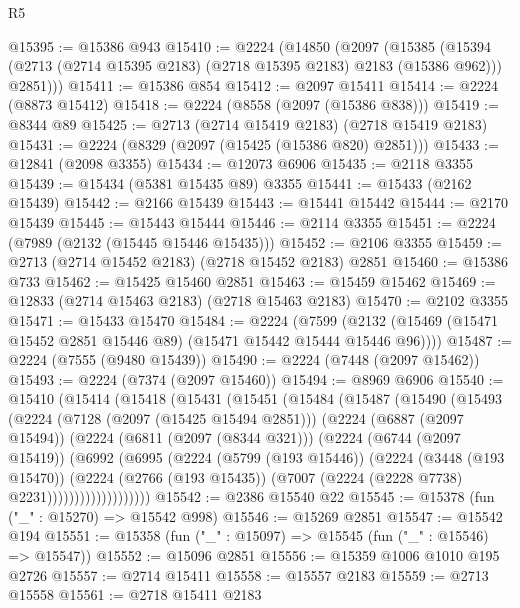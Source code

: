 \begin{lexlean}{R5}
\begin{coremodule}
@15395 := @15386 @943
@15410 := @2224
    (@14850
      (@2097
        (@15385
          (@15394 (@2713 (@2714 @15395 @2183) (@2718 @15395 @2183) @2183 (@15386 @962)))
          @2851)))
@15411 := @15386 @854
@15412 := @2097 @15411
@15414 := @2224 (@8873 @15412)
@15418 := @2224 (@8558 (@2097 (@15386 @838)))
@15419 := @8344 @89
@15425 := @2713 (@2714 @15419 @2183) (@2718 @15419 @2183)
@15431 := @2224 (@8329 (@2097 (@15425 (@15386 @820) @2851)))
@15433 := @12841 (@2098 @3355)
@15434 := @12073 @6906
@15435 := @2118 @3355
@15439 := @15434 (@5381 @15435 @89) @3355
@15441 := @15433 (@2162 @15439)
@15442 := @2166 @15439
@15443 := @15441 @15442
@15444 := @2170 @15439
@15445 := @15443 @15444
@15446 := @2114 @3355
@15451 := @2224 (@7989 (@2132 (@15445 @15446 @15435)))
@15452 := @2106 @3355
@15459 := @2713 (@2714 @15452 @2183) (@2718 @15452 @2183) @2851
@15460 := @15386 @733
@15462 := @15425 @15460 @2851
@15463 := @15459 @15462
@15469 := @12833 (@2714 @15463 @2183) (@2718 @15463 @2183)
@15470 := @2102 @3355
@15471 := @15433 @15470
@15484 := @2224
    (@7599 (@2132 (@15469 (@15471 @15452 @2851 @15446 @89) (@15471 @15442 @15444 @15446 @96))))
@15487 := @2224 (@7555 (@9480 @15439))
@15490 := @2224 (@7448 (@2097 @15462))
@15493 := @2224 (@7374 (@2097 @15460))
@15494 := @8969 @6906
@15540 := @15410
    (@15414
      (@15418
        (@15431
          (@15451
            (@15484
              (@15487
                (@15490
                  (@15493
                    (@2224
                      (@7128 (@2097 (@15425 @15494 @2851)))
                      (@2224
                        (@6887 (@2097 @15494))
                        (@2224
                          (@6811 (@2097 (@8344 @321)))
                          (@2224
                            (@6744 (@2097 @15419))
                            (@6992
                              (@6995
                                (@2224
                                  (@5799 (@193 @15446))
                                  (@2224
                                    (@3448 (@193 @15470))
                                    (@2224
                                      (@2766 (@193 @15435))
                                      (@7007 (@2224 (@2228 @7738) @2231)))))))))))))))))))
@15542 := @2386 @15540 @22
@15545 := @15378 (fun ("_" : @15270) => @15542 @998)
@15546 := @15269 @2851
@15547 := @15542 @194
@15551 := @15358 (fun ("_" : @15097) => @15545 (fun ("_" : @15546) => @15547))
@15552 := @15096 @2851
@15556 := @15359 @1006 @1010 @195 @2726
@15557 := @2714 @15411
@15558 := @15557 @2183
@15559 := @2713 @15558
@15561 := @2718 @15411 @2183

\end{coremodule}
\end{lexlean}

